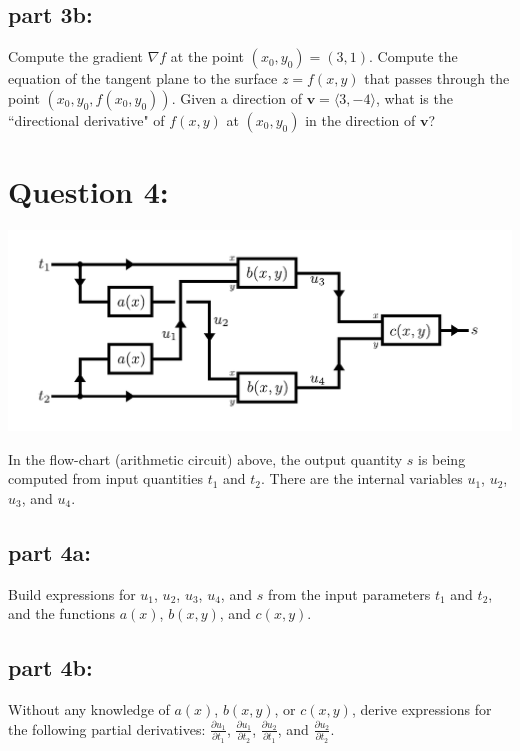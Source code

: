 \documentclass{article}
\newcommand{\partdiff}[2]{\frac{\partial #1}{\partial #2}}
\begin{document}
\subsection*{part 3b:}

Compute the gradient \(\nabla f\) at the point \((x_0,y_0) = (3,1)\). Compute the equation of the tangent plane to the surface \(z = f(x,y)\) that passes through the point \((x_0,y_0,f(x_0,y_0))\). Given a direction of \(\mathbf{v} = \langle 3, -4 \rangle\), what is the ``directional derivative" of \(f(x,y)\) at \((x_0, y_0)\) in the direction of \(\mathbf{v}\)?



\section*{Question 4:}

\begin{center}
\includegraphics[width = \textwidth]{chain_rule_XOR_circuit}
\end{center}

In the flow-chart (arithmetic circuit) above, the output quantity \(s\) is being computed from input quantities \(t_1\) and \(t_2\). There are the internal variables \(u_1\), \(u_2\), \(u_3\), and \(u_4\).

\subsection*{part 4a:}

Build expressions for \(u_1\), \(u_2\), \(u_3\), \(u_4\), and \(s\) from the input parameters \(t_1\) and \(t_2\), and the functions \(a(x)\), \(b(x,y)\), and \(c(x,y)\).

\subsection*{part 4b:}

Without any knowledge of \(a(x)\), \(b(x,y)\), or \(c(x,y)\), derive expressions for the following partial derivatives: \(\partdiff{u_1}{t_1}\), \(\partdiff{u_1}{t_2}\), \(\partdiff{u_2}{t_1}\), and \(\partdiff{u_2}{t_2}\).
\end{document}
